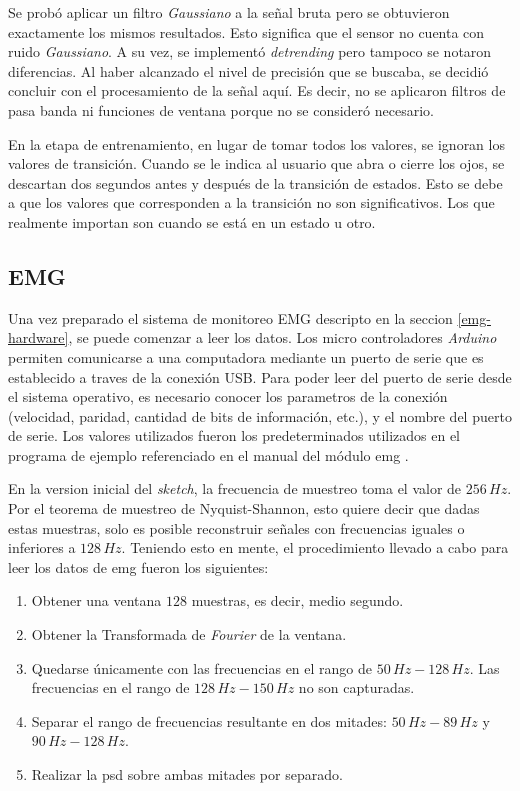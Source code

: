  Se probó aplicar un filtro \emph{Gaussiano} a la señal bruta pero se obtuvieron exactamente los mismos resultados. Esto significa que el sensor no cuenta con ruido \emph{Gaussiano}. A su vez, se implementó \emph{detrending} pero tampoco se notaron diferencias. Al haber alcanzado el nivel de precisión que se buscaba, se decidió concluir con el procesamiento de la señal aquí. Es decir, no se aplicaron filtros de pasa banda ni funciones de ventana porque no se consideró necesario.
 
En la etapa de entrenamiento, en lugar de tomar todos los valores, se ignoran los valores de transición. Cuando se le indica al usuario que abra o cierre los ojos, se descartan dos segundos antes y después de la transición de estados. Esto se debe a que los valores que corresponden a la transición no son significativos. Los que realmente importan son cuando se está en un estado u otro.
 
\subsection{EMG} \label{sec:emg-signal-processing}

Una vez preparado el sistema de monitoreo EMG descripto en la seccion \ref{emg-hardware}, se puede comenzar a leer los datos. Los micro controladores \emph{Arduino} permiten comunicarse a una computadora mediante un puerto de serie que es establecido a traves de la conexión USB.  Para poder leer del puerto de serie desde el sistema operativo, es necesario conocer los parametros de la conexión (velocidad, paridad, cantidad de bits de información, etc.), y el nombre del puerto de serie. Los valores utilizados fueron los predeterminados utilizados en el programa de ejemplo referenciado en el manual del módulo \acrshort{emg} \cite{olimex-manual}.

En la version inicial del \emph{sketch}, la frecuencia de muestreo toma el valor de $256\, Hz$. Por el teorema de muestreo de Nyquist-Shannon, esto quiere decir que dadas estas muestras, solo es posible reconstruir señales con frecuencias iguales o inferiores a $128\, Hz$. Teniendo esto en mente, el procedimiento llevado a cabo para leer los datos de \acrshort{emg} fueron los siguientes:

 \begin{enumerate}
 \item Obtener una ventana $128$ muestras, es decir, medio segundo.
 \item Obtener la Transformada de \emph{Fourier} de la ventana.
 \item Quedarse únicamente con las frecuencias en el rango de $50 \, Hz-128 \, Hz$. Las frecuencias en el rango de $128 \, Hz-150 \, Hz$ no son capturadas.
 \item Separar el rango de frecuencias resultante en dos mitades: $50 \, Hz-89 \, Hz$ y $90 \, Hz-128 \, Hz$.
 \item Realizar la \acrshort{psd} sobre ambas mitades por separado.
 \end{enumerate}

